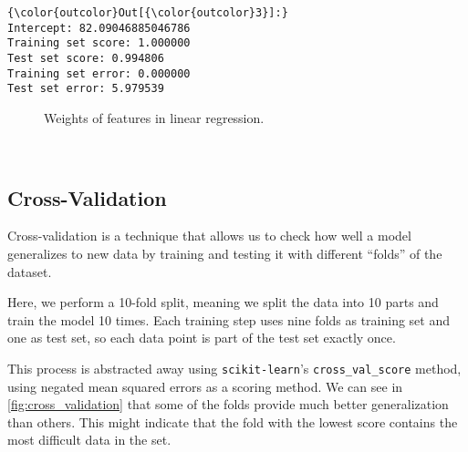 \documentclass[11pt]{article}
\begin{document}
    \begin{Verbatim}[commandchars=\\\{\}]
{\color{outcolor}Out[{\color{outcolor}3}]:}
Intercept: 82.09046885046786
Training set score: 1.000000
Test set score: 0.994806
Training set error: 0.000000
Test set error: 5.979539

    \end{Verbatim}


    \begin{figure}[H]
    	\centering
    	    \caption{Weights of features in linear regression.}
    	    \label{fig:weights_lr}
    \end{figure}
  
    { \hspace*{\fill} \\}
    
    \hypertarget{cross-validation}{%
\subsection{Cross-Validation}\label{cross-validation}}

Cross-validation is a technique that allows us to check how well a model
generalizes to new data by training and testing it with different
``folds'' of the dataset.

Here, we perform a 10-fold split, meaning we split the data into 10
parts and train the model 10 times. Each training step uses nine folds
as training set and one as test set, so each data point is part of the
test set exactly once.

This process is abstracted away using \texttt{scikit-learn}'s
\texttt{cross\_val\_score} method, using negated mean squared errors as
a scoring method. We can see in \autoref{fig:cross_validation} that some of the folds provide much better
generalization than others. This might indicate that the fold with the
lowest score contains the most difficult data in the set.
\end{document}
